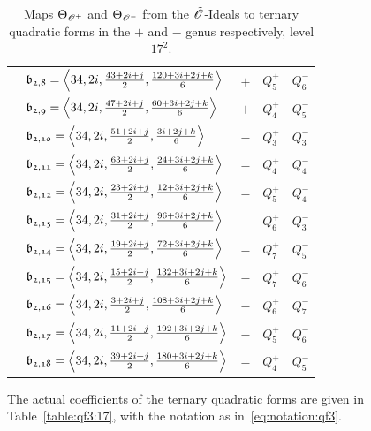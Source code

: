 \begin{table}
\begin{tabular}{|c|l|c|c|c|}
 & $\id{b_{2,8}}=\<34,2i,\frac{43+2i+j}{2},\frac{120+3i+2j+k}{6}>$ & $+$ & $Q_{5}^{+}$ & $Q_{6}^{-}$\\
 & $\id{b_{2,9}}=\<34,2i,\frac{47+2i+j}{2},\frac{60+3i+2j+k}{6}>$ & $+$ & $Q_{4}^{+}$ & $Q_{5}^{-}$\\
 & $\id{b_{2,10}}=\<34,2i,\frac{51+2i+j}{2},\frac{3i+2j+k}{6}>$ & $-$ & $Q_{3}^{+}$ & $Q_{3}^{-}$\\
 & $\id{b_{2,11}}=\<34,2i,\frac{63+2i+j}{2},\frac{24+3i+2j+k}{6}>$ & $-$ & $Q_{4}^{+}$ & $Q_{4}^{-}$\\
 & $\id{b_{2,12}}=\<34,2i,\frac{23+2i+j}{2},\frac{12+3i+2j+k}{6}>$ & $-$ & $Q_{5}^{+}$ & $Q_{4}^{-}$\\
 & $\id{b_{2,13}}=\<34,2i,\frac{31+2i+j}{2},\frac{96+3i+2j+k}{6}>$ & $-$ & $Q_{6}^{+}$ & $Q_{3}^{-}$\\
 & $\id{b_{2,14}}=\<34,2i,\frac{19+2i+j}{2},\frac{72+3i+2j+k}{6}>$ & $-$ & $Q_{7}^{+}$ & $Q_{5}^{-}$\\
 & $\id{b_{2,15}}=\<34,2i,\frac{15+2i+j}{2},\frac{132+3i+2j+k}{6}>$ & $-$ & $Q_{7}^{+}$ & $Q_{6}^{-}$\\
 & $\id{b_{2,16}}=\<34,2i,\frac{3+2i+j}{2},\frac{108+3i+2j+k}{6}>$ & $-$ & $Q_{6}^{+}$ & $Q_{7}^{-}$\\
 & $\id{b_{2,17}}=\<34,2i,\frac{11+2i+j}{2},\frac{192+3i+2j+k}{6}>$ & $-$ & $Q_{5}^{+}$ & $Q_{6}^{-}$\\
 & $\id{b_{2,18}}=\<34,2i,\frac{39+2i+j}{2},\frac{180+3i+2j+k}{6}>$ & $-$ & $Q_{4}^{+}$ & $Q_{5}^{-}$\\
\hline
\end{tabular}
\caption{Maps ${\Theta}_{{{\mathscr{O}}^+}}$ and ${\Theta}_{{{\mathscr{O}}^-}}$ from the ${\tilde{{\mathscr{O}}}}$-Ideals
to ternary quadratic forms in the $+$ and $-$ genus respectively, level $17^2$.
          \label{table:psi:17}}
\end{table}
The actual coefficients of the ternary quadratic forms are given in
Table~\ref{table:qf3:17}, with the notation
as in~\eqref{eq:notation:qf3}.
